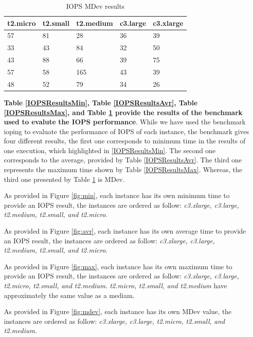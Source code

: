 \documentclass[10pt, conference]{IEEEtran}
\begin{document}
\begin{center}
\begin{table}
\begin{center}
\begin{tabular}{|l|l|l|l|l|}
  \hline
t2.micro & t2.small & 	t2.medium & 	c3.large & 	c3.xlarge \\
\hline 
57 &	81 &	28 &	36 &	39 \\
33 &	43 &	84 &	32 &	50 \\
43 &	88 &	66 &	39 &	75 \\
57 &	58 &	165 &	43 &	39 \\
48 &	52 &	79 &	34 &	26 \\
\hline
\end{tabular}
\caption{\label{IOPSResultsMDev} IOPS MDev results}
\end{center}
\end{table}
\end{center}

\textbf{Table \ref{IOPSResultsMin}, Table \ref{IOPSResultsAvr}, Table \ref{IOPSResultsMax}, and Table \ref{IOPSResultsMDev} provide the results of the benchmark used to evalute the IOPS performance}. While we have used the benchmark ioping to evaluate the performance of IOPS of each instance, the benchmark gives four different results, the first one corresponds to minimum time in the results of one execution, which highlighted in \ref{IOPSResultsMin}. The second one corresponds to the average, provided by Table \ref{IOPSResultsAvr}. The third one represents the maximum time shown by Table \ref{IOPSResultsMax}. Whereas, the third one presented by Table \ref{IOPSResultsMDev} is MDev.

As provided in Figure \ref{fig:min}, each instance has its own minimum time to provide an IOPS result, the instances are ordered as follow: \textit{c3.xlarge, c3.large, t2.medium, t2.small, and t2.micro}.

As provided in Figure \ref{fig:avr}, each instance has its own average time to provide an IOPS result, the instances are ordered as follow: \textit{c3.xlarge, c3.large, t2.medium, t2.small, and t2.micro}.

As provided in Figure \ref{fig:max}, each instance has its own maximum time to provide an IOPS result, the instances are ordered as follow: \textit{c3.xlarge, c3.large, t2.micro, t2.small, and t2.medium}. \textit{t2.micro, t2.small, and t2.medium} have approximately the same value as a mediam. 

As provided in Figure \ref{fig:mdev}, each instance has its own MDev value, the instances are ordered as follow: \textit{c3.xlarge, c3.large, t2.micro, t2.small, and t2.medium}.
\end{document}
